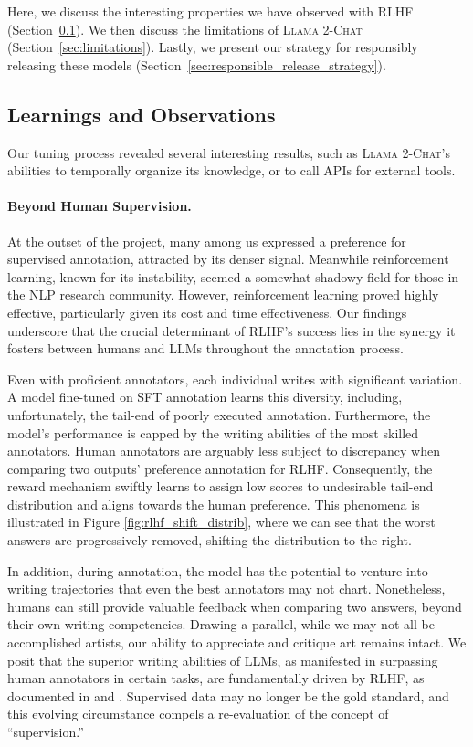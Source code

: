 Here, we discuss the interesting properties we have observed with RLHF (Section~\ref{sec:rlhf_dark_magic}). We then discuss the limitations of \textsc{Llama 2-Chat} (Section~\ref{sec:limitations}). Lastly, we present our strategy for responsibly releasing these models (Section~\ref{sec:responsible_release_strategy}).

\subsection{Learnings and Observations}
\label{sec:rlhf_dark_magic}

Our tuning process revealed several interesting results, such as \textsc{Llama 2-Chat}'s abilities to temporally organize its knowledge, or to call APIs for external tools.

\paragraph{Beyond Human Supervision.} At the outset of the project, many among us expressed a preference for supervised annotation, attracted by its denser signal. Meanwhile reinforcement learning, known for its instability, seemed a somewhat shadowy field for those in the NLP research community. However, reinforcement learning proved highly effective, particularly given its cost and time effectiveness. Our findings underscore that the crucial determinant of RLHF's success lies in the synergy it fosters between humans and LLMs throughout the annotation process.

Even with proficient annotators, each individual writes with significant variation. A model fine-tuned on SFT annotation learns this diversity, including, unfortunately, the tail-end of poorly executed annotation. Furthermore, the model's performance is capped by the writing abilities of the most skilled annotators. Human annotators are arguably less subject to discrepancy when comparing two outputs' preference annotation for RLHF. Consequently, the reward mechanism swiftly learns to assign low scores to undesirable tail-end distribution and aligns towards the human preference. This phenomena is illustrated in Figure \ref{fig:rlhf_shift_distrib}, where we can see that the worst answers are progressively removed, shifting the distribution to the right.

In addition, during annotation, the model has the potential to venture into writing trajectories that even the best annotators may not chart. Nonetheless, humans can still provide valuable feedback when comparing two answers, beyond their own writing competencies. Drawing a parallel, while we may not all be accomplished artists, our ability to appreciate and critique art remains intact. We posit that the superior writing abilities of LLMs, as manifested in surpassing human annotators in certain tasks, are fundamentally driven by RLHF, as documented in \cite{gilardi2023chatgpt} and \cite{huang2023chatgpt}. Supervised data may no longer be the gold standard, and this evolving circumstance compels a re-evaluation of the concept of ``supervision.''

